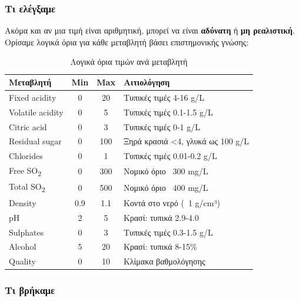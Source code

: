 \documentclass[12pt,a4paper]{article}
\begin{document}
\subsubsection{Τι ελέγξαμε}

Ακόμα και αν μια τιμή είναι αριθμητική, μπορεί να είναι \textbf{αδύνατη} ή \textbf{μη ρεαλιστική}. Ορίσαμε λογικά όρια για κάθε μεταβλητή βάσει επιστημονικής γνώσης:

\begin{table}[H]
\centering
\caption{Λογικά όρια τιμών ανά μεταβλητή}
\label{tab:limits}
\begin{tabular}{@{}lccp{5cm}@{}}
\toprule
\textbf{Μεταβλητή} & \textbf{Min} & \textbf{Max} & \textbf{Αιτιολόγηση} \\
\midrule
Fixed acidity & 0 & 20 & Τυπικές τιμές 4-16 g/L \\
Volatile acidity & 0 & 5 & Τυπικές τιμές 0.1-1.5 g/L \\
Citric acid & 0 & 3 & Τυπικές τιμές 0-1 g/L \\
Residual sugar & 0 & 100 & Ξηρά κρασιά <4, γλυκά ως 100 g/L \\
Chlorides & 0 & 1 & Τυπικές τιμές 0.01-0.2 g/L \\
Free SO\textsubscript{2} & 0 & 300 & Νομικό όριο ~300 mg/L \\
Total SO\textsubscript{2} & 0 & 500 & Νομικό όριο ~400 mg/L \\
Density & 0.9 & 1.1 & Κοντά στο νερό (~1 g/cm³) \\
pH & 2 & 5 & Κρασί: τυπικά 2.9-4.0 \\
Sulphates & 0 & 3 & Τυπικές τιμές 0.3-1.5 g/L \\
Alcohol & 5 & 20 & Κρασί: τυπικά 8-15\% \\
Quality & 0 & 10 & Κλίμακα βαθμολόγησης \\
\bottomrule
\end{tabular}
\end{table}

\subsubsection{Τι βρήκαμε}
\end{document}
